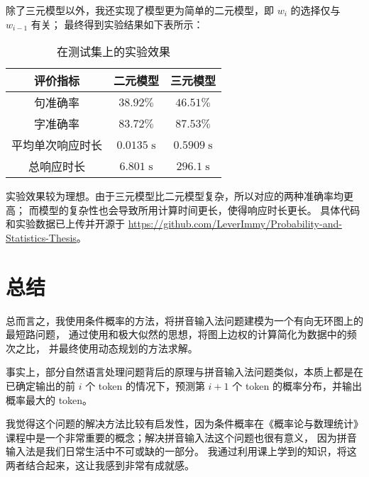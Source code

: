 \documentclass[UTF8]{ctexart}
\begin{document}
除了三元模型以外，我还实现了模型更为简单的二元模型，即 $w_i$ 的选择仅与 $w_{i-1}$ 有关；
最终得到实验结果如下表所示：
\begin{table}[H]
    \centering
    \begin{tabular}{||c||c|c||}
        \hline
        评价指标 & 二元模型 & 三元模型 \\
        \hline
        句准确率 & $38.92\%$ & $46.51\%$ \\
        字准确率 & $83.72\%$ & $87.53\%$ \\
        平均单次响应时长 & $0.0135\;\mathrm{s}$ & $0.5909\;\mathrm{s}$ \\
        总响应时长 & $6.801\;\mathrm{s}$ & $296.1\;\mathrm{s}$ \\
        \hline
    \end{tabular}
    \caption{在测试集上的实验效果}
\end{table}
实验效果较为理想。由于三元模型比二元模型复杂，所以对应的两种准确率均更高；
而模型的复杂性也会导致所用计算时间更长，使得响应时长更长。
具体代码和实验数据已上传并开源于 \url{https://github.com/LeverImmy/Probability-and-Statistics-Thesis}。

\section{总结}

总而言之，我使用条件概率的方法，将拼音输入法问题建模为一个有向无环图上的最短路问题，
通过使用和极大似然的思想，将图上边权的计算简化为数据中的频次之比，
并最终使用动态规划的方法求解。

事实上，部分自然语言处理问题背后的原理与拼音输入法问题类似，本质上都是在已确定输出的前 $i$ 个 token
的情况下，预测第 $i+1$ 个 token 的概率分布，并输出概率最大的 token。

我觉得这个问题的解决方法比较有启发性，因为条件概率在《概率论与数理统计》
课程中是一个非常重要的概念；解决拼音输入法这个问题也很有意义，
因为拼音输入法是我们日常生活中不可或缺的一部分。
我通过利用课上学到的知识，将这两者结合起来，这让我感到非常有成就感。
\end{document}
